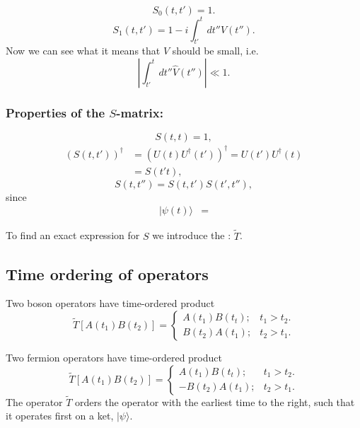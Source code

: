 \[S_{0}(t,t')=1.\]
\[S_{1}(t,t')=1-i\int_{t'}^{t}dt''\hat{V}(t'').\]
Now we can see what it means that $V$ should be small, i.e. \[\left|\int_{t'}^{t}dt''\hat{V}(t'')\right|\ll1.\]
\begin{Indentskip}
	\subsubsection*{Properties of the $S$-matrix:}
	\[S(t,t)=1,\]
	\begin{align}
		\left(S(t,t')\right)^{\dagger}&=\left(U(t)U^{\dagger}(t')\right)^{\dagger} = U(t')U^{\dagger}(t)\nonumber \\
	&=S(t't),\nonumber
	\end{align}
	\[S(t,t'')=S(t,t')S(t',t''),\] since
	\begin{align}
		|\psi(t)\rangle&=    \nonumber
	\end{align}
\end{Indentskip}
To find an exact expression for $S$ we introduce the : $\tilde{T}$.




\subsection{Time ordering of operators}
Two boson operators have time-ordered product 
\[\tilde{T}[A(t_{1})B(t_{2})]= \begin{cases}A(t_{1})B(t_{t}); & t_{1}>t_{2}.\\
B(t_{2})A(t_{1}); & t_{2}>t_{1}.
\end{cases} \]

Two fermion operators have time-ordered product
\[\tilde{T}[A(t_{1})B(t_{2})]= \begin{cases}A(t_{1})B(t_{t}); & t_{1}>t_{2}.\\
-B(t_{2})A(t_{1}); & t_{2}>t_{1}.
\end{cases} \] 
The operator $\tilde{T}$ orders the operator with the earliest time to the right, such that it operates first on a ket, $|\psi\rangle$.

